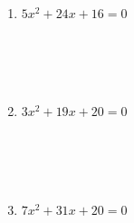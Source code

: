 \documentclass[12pt]{article}
\begin{document}
\begin{enumerate}
\begin{enumerate}
        \item $5x^2 + 24x + 16 = 0$
        \[
        \begin{array}{c}
        \\ \\ \\ \\ \\ \\ \\ \\ \\ \\ \\ \\
        \end{array}
        \]

        \item $3x^2 + 19x + 20 = 0$
        \[
        \begin{array}{c}
        \\ \\ \\ \\ \\ \\ \\ \\ \\ \\ \\ \\
        \end{array}
        \]

        \item $7x^2 + 31x + 20 = 0$
        \[
        \begin{array}{c}
        \\ \\ \\ \\ \\ \\ \\ \\ \\ \\ \\ \\
        \end{array}
        \]
    \end{enumerate}


\end{enumerate}
\end{document}
